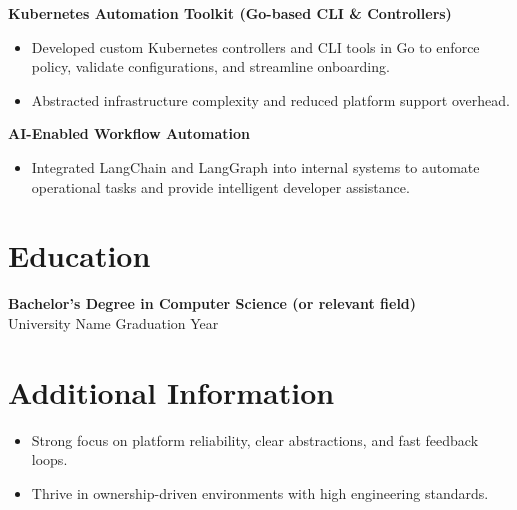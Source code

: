 \documentclass[11pt,a4paper]{article}
\begin{document}
\textbf{Kubernetes Automation Toolkit (Go-based CLI \& Controllers)} \\
\begin{itemize}[leftmargin=*, itemsep=4pt]
    \item Developed custom Kubernetes controllers and CLI tools in Go to enforce policy, validate configurations, and streamline onboarding.
    \item Abstracted infrastructure complexity and reduced platform support overhead.
\end{itemize}

\textbf{AI-Enabled Workflow Automation} \\
\begin{itemize}[leftmargin=*, itemsep=4pt]
    \item Integrated LangChain and LangGraph into internal systems to automate operational tasks and provide intelligent developer assistance.
\end{itemize}

\vspace{6pt}

\section*{Education}

\textbf{Bachelor’s Degree in Computer Science (or relevant field)} \\
University Name \hfill Graduation Year

\vspace{6pt}

\section*{Additional Information}

\begin{itemize}[leftmargin=*, itemsep=4pt]
    \item Strong focus on platform reliability, clear abstractions, and fast feedback loops.
    \item Thrive in ownership-driven environments with high engineering standards.
\end{itemize}
\end{document}
